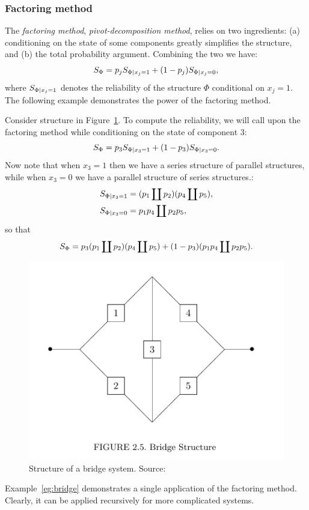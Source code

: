 \subsubsection{Factoring method}
The \emph{factoring method}, \aka \emph{pivot-decomposition method}, relies on two ingredients: 
(a) conditioning on the state of some components greatly simplifies the structure, and
(b) the total probability argument.
Combining the two we have:
$$ S_\Phi= p_j  S_{\Phi|x_j=1} + (1-p_j) S_{\Phi|x_j=0}   ,$$
where $S_{\Phi|x_j=1}$ denotes the reliability of the structure $\Phi$ conditional on $x_j=1$.
The following example demonstrates the power of the factoring method.

\begin{example}
\label{eg:bridge}
Consider structure in Figure~\ref{fig:bridge}.
To compute the reliability, we will call upon the factoring method while conditioning on the state of component $3$:
$$ S_\Phi= p_3  S_{\Phi|x_3=1} + (1-p_3) S_{\Phi|x_3=0}   .$$
Now note that when $x_3=1$ then we have a series structure of parallel structures, while when $x_3=0$ we have a parallel structure of series structures.:
\begin{align*}
	S_{\Phi|x_3=1} &= (p_1 \coprod p_2) (p_4 \coprod p_5),\\
	S_{\Phi|x_3=0} &=  p_1 p_4 \coprod p_2 p_5,
\end{align*}
so that 
$$ 	
	S_\Phi = p_3  (p_1 \coprod p_2) (p_4 \coprod p_5) + (1-p_3) (p_1 p_4 \coprod p_2 p_5).
$$
\begin{figure}[ht]
\centering
\includegraphics[width=0.5\linewidth]{art/bridge}
\caption[Bridge Structure]{Structure of a bridge system. Source: \cite[Fig.2.5]{aven_stochastic_1999}}
\label{fig:bridge}
\end{figure}
\end{example}
Example~\ref{eg:bridge} demonstrates a single application of the factoring method. Clearly, it can be applied recursively for more complicated systems.

